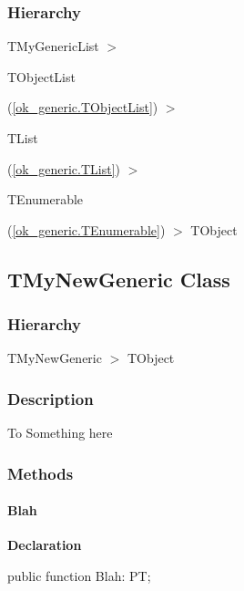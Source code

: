 \documentclass{report}
\begin{document}
\subsubsection*{\large{\textbf{Hierarchy}}\normalsize\hspace{1ex}\hfill}
TMyGenericList {$>$} \begin{ttfamily}TObjectList\end{ttfamily}(\ref{ok_generic.TObjectList}) {$>$} \begin{ttfamily}TList\end{ttfamily}(\ref{ok_generic.TList}) {$>$} \begin{ttfamily}TEnumerable\end{ttfamily}(\ref{ok_generic.TEnumerable}) {$>$} 
TObject
\subsection*{TMyNewGeneric Class}
\subsubsection*{\large{\textbf{Hierarchy}}\normalsize\hspace{1ex}\hfill}
TMyNewGeneric {$>$} TObject
\subsubsection*{\large{\textbf{Description}}\normalsize\hspace{1ex}\hfill}
To Something here\subsubsection*{\large{\textbf{Methods}}\normalsize\hspace{1ex}\hfill}
\paragraph*{Blah}\hspace*{\fill}

\begin{list}{}{
\setlength{\itemindent}{0cm}
\setlength{\listparindent}{0cm}
\setlength{\leftmargin}{\evensidemargin}
\addtolength{\leftmargin}{\tmplength}
\settowidth{\labelsep}{X}
\addtolength{\leftmargin}{\labelsep}
\setlength{\labelwidth}{\tmplength}
}
\begin{flushleft}
\item[\textbf{Declaration}\hfill]
\begin{ttfamily}
public function Blah: PT;\end{ttfamily}


\end{flushleft}
\end{list}
\end{document}
